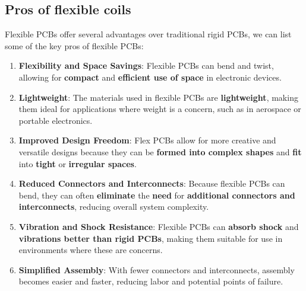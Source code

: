 \subsection{Pros of flexible coils}
Flexible PCBs offer several advantages over traditional rigid PCBs, we can list some of the key pros of flexible PCBs:

\begin{enumerate}
    \item \textbf{Flexibility and Space Savings}: Flexible PCBs can bend and twist, allowing for \textbf{compact} and \textbf{efficient use of space} in electronic devices.
    
    \item \textbf{Lightweight}: The materials used in flexible PCBs are \textbf{lightweight}, making them ideal for applications where weight is a concern, such as in aerospace or portable electronics.
    
    \item \textbf{Improved Design Freedom}: Flex PCBs allow for more creative and versatile designs because they can be \textbf{formed into complex shapes} and \textbf{fit} into \textbf{tight} or \textbf{irregular spaces}.
    
    \item \textbf{Reduced Connectors and Interconnects}: Because flexible PCBs can bend, they can often \textbf{eliminate} the \textbf{need} for \textbf{additional connectors and interconnects}, reducing overall system complexity.
    
    \item \textbf{Vibration and Shock Resistance}: Flexible PCBs can \textbf{absorb shock} and \textbf{vibrations better than rigid PCBs}, making them suitable for use in environments where these are concerns.

    \item \textbf{Simplified Assembly}: With fewer connectors and interconnects, assembly becomes easier and faster, reducing labor and potential points of failure.
\end{enumerate}